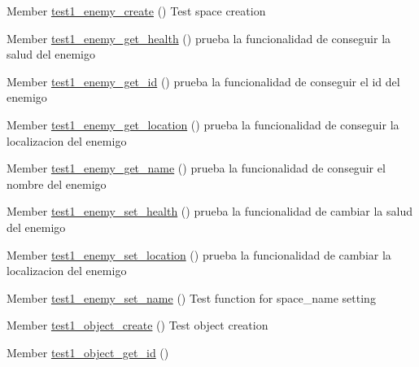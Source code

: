 
\begin{DoxyRefList}
\item[Member \mbox{\hyperlink{enemy__test_8h_a4a71bf582b53ed446aa5a39d4aa6a0a8}{test1\+\_\+enemy\+\_\+create}} ()]\label{test__test000001}%
%
Test space creation  
\item[Member \mbox{\hyperlink{enemy__test_8h_a968263ff8ca7e8f62a7dc99eb09a9f55}{test1\+\_\+enemy\+\_\+get\+\_\+health}} ()]\label{test__test000015}%
%
prueba la funcionalidad de conseguir la salud del enemigo  
\item[Member \mbox{\hyperlink{enemy__test_8h_a3ce88b09c08fd513236d67aef0765362}{test1\+\_\+enemy\+\_\+get\+\_\+id}} ()]\label{test__test000008}%
%
prueba la funcionalidad de conseguir el id del enemigo  
\item[Member \mbox{\hyperlink{enemy__test_8h_a9ad863da9ba452b19f28ee35205ecdf0}{test1\+\_\+enemy\+\_\+get\+\_\+location}} ()]\label{test__test000013}%
%
prueba la funcionalidad de conseguir la localizacion del enemigo  
\item[Member \mbox{\hyperlink{enemy__test_8h_ab0bd50d5979a9f9726ce086545cace2b}{test1\+\_\+enemy\+\_\+get\+\_\+name}} ()]\label{test__test000006}%
%
prueba la funcionalidad de conseguir el nombre del enemigo  
\item[Member \mbox{\hyperlink{enemy__test_8h_a48683fe1cc5a5ce954f7f37eaf939a20}{test1\+\_\+enemy\+\_\+set\+\_\+health}} ()]\label{test__test000017}%
%
prueba la funcionalidad de cambiar la salud del enemigo  
\item[Member \mbox{\hyperlink{enemy__test_8h_a4403c0f195f0d89dbc100701fc3e84f3}{test1\+\_\+enemy\+\_\+set\+\_\+location}} ()]\label{test__test000010}%
%
prueba la funcionalidad de cambiar la localizacion del enemigo  
\item[Member \mbox{\hyperlink{enemy__test_8h_a35e9f4ac21333e62185e03879fbe6f92}{test1\+\_\+enemy\+\_\+set\+\_\+name}} ()]\label{test__test000003}%
%
Test function for space\+\_\+name setting  
\item[Member \mbox{\hyperlink{object__test_8h_a3836d69f92ce7149d56bafcaec83f516}{test1\+\_\+object\+\_\+create}} ()]\label{test__test000020}%
%
Test object creation  
\item[Member \mbox{\hyperlink{object__test_8h_aa88e9e9dab92ba9c58851d7a7a8415f0}{test1\+\_\+object\+\_\+get\+\_\+id}} ()]\label{test__test000022}%

\end{DoxyRefList}
